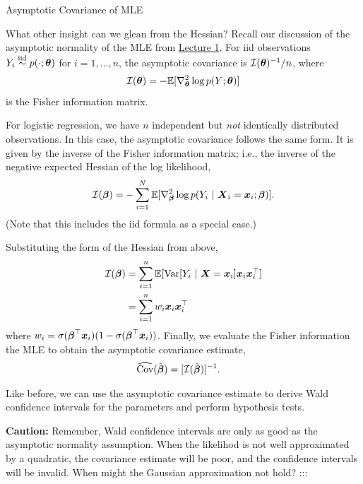 \documentclass[aspectratio=169]{beamer}
\begin{document}
\begin{frame}[t,allowframebreaks]{Asymptotic Covariance of
MLE}\label{asymptotic-covariance-of-mle}

What other insight can we glean from the Hessian? Recall our discussion
of the asymptotic normality of the MLE from
\href{01_distributions.ipynb}{Lecture 1}. For iid observations
\(Y_i \stackrel{\text{iid}}{\sim} p(\cdot; \boldsymbol{\theta})\) for \(i=1,\ldots,n\), the
asymptotic covariance is \(\mathcal{I}(\boldsymbol{\theta})^{-1} / n\), where
\begin{align*}
\mathcal{I}(\boldsymbol{\theta})= -\mathbb{E}[\nabla_{\boldsymbol{\theta}}^2 \log p(Y; \boldsymbol{\theta})]
\end{align*} is the Fisher information matrix.

For logistic regression, we have \(n\) independent but \emph{not}
identically distributed observations. In this case, the asymptotic
covariance follows the same form. It is given by the inverse of the
Fisher information matrix; i.e., the inverse of the negative expected
Hessian of the log likelihood, \begin{align*}
\mathcal{I}(\boldsymbol{\beta}) = -\sum_{i=1}^N \mathbb{E}[\nabla_{\boldsymbol{\beta}}^2 \log p(Y_i ~\vert~ \boldsymbol{X}_i=\boldsymbol{x}_i; \boldsymbol{\beta})].
\end{align*} (Note that this includes the iid formula as a special
case.)

Substituting the form of the Hessian from above, \begin{align*}
\mathcal{I}(\boldsymbol{\beta})
&= \sum_{i=1}^n \mathbb{E}[\textrm{Var}[Y_i ~\vert~ \boldsymbol{X} = \boldsymbol{x}_i] \boldsymbol{x}_i \boldsymbol{x}_i^\top] \\
&= \sum_{i=1}^n w_i \boldsymbol{x}_i \boldsymbol{x}_i^\top 
\end{align*} where
\(w_i = \sigma(\boldsymbol{\beta}^\top \boldsymbol{x}_i) (1 - \sigma(\boldsymbol{\beta}^\top \boldsymbol{x}_i))\).
Finally, we evaluate the Fisher information the MLE to obtain the
asymptotic covariance estimate, \begin{align*}
\widehat{\textrm{Cov}}(\hat{\boldsymbol{\beta}}) &= [\mathcal{I}(\hat{\boldsymbol{\beta}})]^{-1}.
\end{align*}

Like before, we can use the asymptotic covariance estimate to derive
Wald confidence intervals for the parameters and perform hypothesis
tests.

\textbf{Caution:} Remember, Wald confidence
intervals are only as good as the asymptotic normality assumption. When
the likelihod is not well approximated by a quadratic, the covariance
estimate will be poor, and the confidence intervals will be invalid.
When might the Gaussian approximation not hold? :::
\end{frame}
\end{document}
